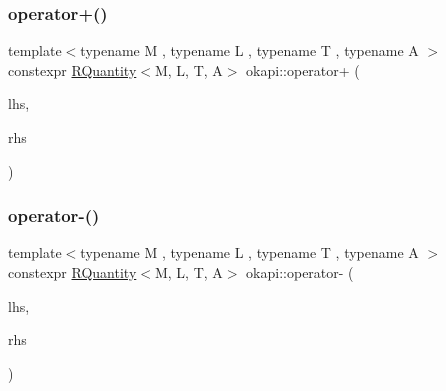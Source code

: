 \mbox{\label{namespaceokapi_a20ba46b94c486e1b70ef5cb364ffe086}} 
\subsubsection{\texorpdfstring{operator+()}{operator+()}}
{\footnotesize\ttfamily template$<$typename M , typename L , typename T , typename A $>$ \\
constexpr \mbox{\hyperlink{classokapi_1_1RQuantity}{R\+Quantity}}$<$M, L, T, A$>$ okapi\+::operator+ (\begin{DoxyParamCaption}\item[{const \mbox{\hyperlink{classokapi_1_1RQuantity}{R\+Quantity}}$<$ M, L, T, A $>$ \&}]{lhs,  }\item[{const \mbox{\hyperlink{classokapi_1_1RQuantity}{R\+Quantity}}$<$ M, L, T, A $>$ \&}]{rhs }\end{DoxyParamCaption})}

\mbox{\label{namespaceokapi_ab3362da609b98790e6301285a939545f}} 
\subsubsection{\texorpdfstring{operator-\/()}{operator-()}}
{\footnotesize\ttfamily template$<$typename M , typename L , typename T , typename A $>$ \\
constexpr \mbox{\hyperlink{classokapi_1_1RQuantity}{R\+Quantity}}$<$M, L, T, A$>$ okapi\+::operator-\/ (\begin{DoxyParamCaption}\item[{const \mbox{\hyperlink{classokapi_1_1RQuantity}{R\+Quantity}}$<$ M, L, T, A $>$ \&}]{lhs,  }\item[{const \mbox{\hyperlink{classokapi_1_1RQuantity}{R\+Quantity}}$<$ M, L, T, A $>$ \&}]{rhs }\end{DoxyParamCaption})}

\mbox{\label{namespaceokapi_a5b9c69030c20a9e0d0882bd4d9546597}} 
